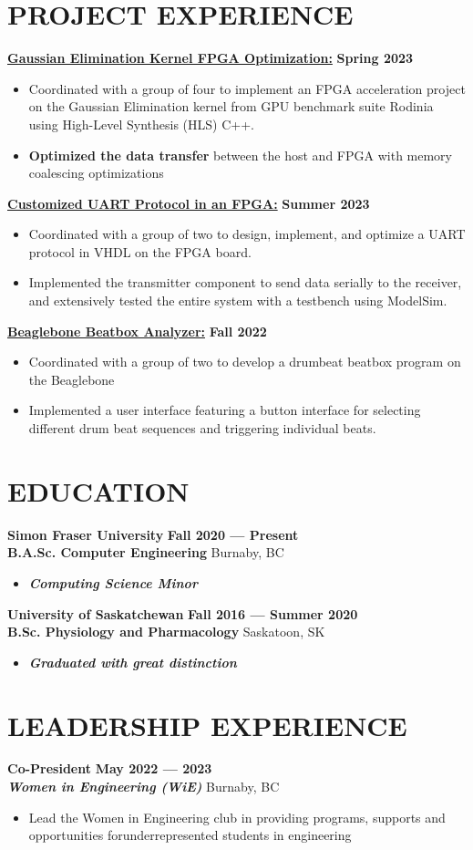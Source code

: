 \documentclass[letterpaper,11pt]{article}
\newcommand{\Item} [1] {
    \item\small{{#1 \vspace{-2pt}}}
}
\newcommand{\employer} [5] {
    {\textbf{#3} \hfill \textbf{#4 --- #5}\\ \textbf{\emph{#1}} \hfill #2\\}
}
\newcommand{\school} [6] {
    {\textbf{#1} \hfill \textbf{#5 --- #6}\\ \textbf{#3} \hfill #2\\ \begin{itemize}[topsep=0pt,itemsep=-2pt]\item{\textbf{\emph{#4}}}\end{itemize}}
}
\newcommand{\workItemListStart} [0] {
    \vspace{-1pt}
    \begin{itemize}[topsep=0pt,itemsep=-2pt]
}
\newcommand{\workItemListEnd} [0] {
    \end{itemize}
    \vspace{1pt}
}
\newcommand{\resumeItemListStart} [0] {
    \vspace{2pt}
    \begin{itemize}[topsep=0pt,itemsep=-2pt]
}
\newcommand{\resumeItemListEnd} [0] {
    \end{itemize}
    \vspace{5pt}
}
\begin{document}
    \section{PROJECT EXPERIENCE}
    {{\color{colorValue}} \underline{\textbf{Gaussian Elimination Kernel FPGA Optimization:}}} \hfill \textbf{Spring 2023}
    \resumeItemListStart{}
        \Item{Coordinated with a group of four to implement an FPGA acceleration project on the Gaussian Elimination kernel from GPU benchmark suite Rodinia using High-Level Synthesis (HLS) C++.}
        \Item{\textbf{Optimized the data transfer} between the host and FPGA with memory coalescing optimizations}
    \resumeItemListEnd{}
    {{\color{colorValue}} \underline{\textbf{Customized UART Protocol in an FPGA:}}} \hfill \textbf{Summer 2023}
    \resumeItemListStart{}
        \Item{Coordinated with a group of two to design, implement, and optimize a UART protocol in VHDL on the FPGA board.}
        \Item{Implemented the transmitter component to send data serially to the receiver, and extensively tested the entire system with a testbench using ModelSim.}
    \resumeItemListEnd{}
    {{\color{colorValue}} \underline{\textbf{Beaglebone Beatbox Analyzer:}}} \hfill \textbf{Fall 2022}
    \resumeItemListStart{}
        \Item{Coordinated with a group of two to develop a drumbeat beatbox program on the Beaglebone}
        \Item{Implemented a user interface featuring a button interface for selecting different drum beat sequences and triggering individual beats.}
    \resumeItemListEnd{}

    \section{EDUCATION}
    \school{Simon Fraser University}{Burnaby, BC}{B.A.Sc. Computer Engineering}{Computing Science Minor}{Fall 2020}{Present}
    \school{University of Saskatchewan}{Saskatoon, SK}{B.Sc. Physiology and Pharmacology}{Graduated with great distinction}{Fall 2016}{Summer 2020}

    \section{LEADERSHIP EXPERIENCE}
    \employer{Women in Engineering (WiE)}{Burnaby, BC}{Co-President}{May 2022}{2023}
    \workItemListStart{}
        \Item{Lead the Women in Engineering club in providing programs, supports and opportunities forunderrepresented students in engineering}
    \workItemListEnd{}
\end{document}
